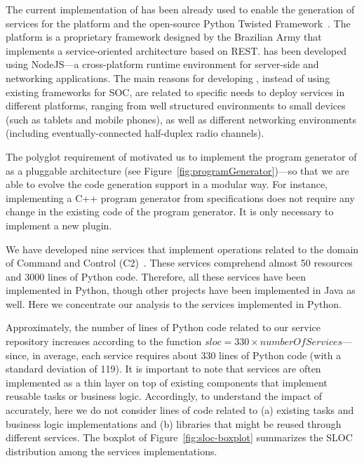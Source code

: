 The current implementation of \neoidl{} has been already used
to enable the generation of services for the \neocortex{} platform and the open-source 
Python Twisted Framework~\cite{twisted:book}. The \neocortex{} platform is 
a proprietary framework designed by the Brazilian Army that implements 
a service-oriented architecture based on
REST. \neocortex{} has been developed using  NodeJS---a cross-platform
runtime environment for server-side and networking applications.
The main reasons for
developing \neocortex{}, instead of using existing frameworks for 
SOC, are related to specific needs to deploy services in
different platforms, ranging from well structured environments to
small devices (such as tablets and mobile phones), as well as different
networking environments (including eventually-connected half-duplex
radio channels).

The polyglot requirement of \neocortex{} motivated us to implement 
the program generator of \neoidl{} as a pluggable architecture 
(see Figure~\ref{fig:programGenerator})---so that
we are able to evolve the code generation support in a modular
way. For instance, implementing a C++ program generator from \neoidl{}
specifications does not require any change in the existing code of the
program generator. It is only necessary to implement a new \neoidl{}
plugin. 


We have developed nine services that implement operations related to 
the domain of Command and Control (C2)~\cite{david:commandControl}. 
These services comprehend almost 50 resources and 
3000 lines of Python code. Therefore, all these services have been
implemented in Python, though other projects have been implemented in
Java as well. Here we concentrate our analysis to the services implemented
in Python. 

Approximately, the number of lines of Python code related to 
our service repository increases according to the 
function $sloc = 330 \times numberOfServices$--- since, in average, each
service requires about 330 lines of Python code (with a standard
deviation of 119). It is important to note that services are often
implemented as a thin layer on top of existing components that
implement reusable tasks or business logic. Accordingly, to understand
the impact of \neoidl{} accurately, here we do not consider lines of code related to (a) existing tasks and 
business logic implementations and (b) libraries that might be 
reused through different services. 
The boxplot of Figure~\ref{fig:sloc-boxplot}
summarizes the SLOC distribution among the services 
implementations. 

